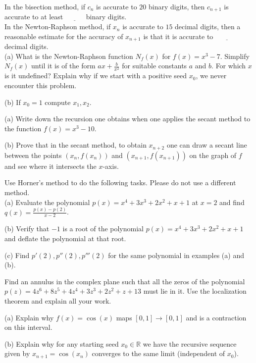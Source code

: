 \documentclass[12pt]{article}
\begin{document}
\newpage
{}
In the bisection method, if $c_n$ is accurate to $20$ binary digits, then $c_{n+1}$ is accurate to at least $\underline{~~~~~~~~~~~~}$ binary digits. \\
In the Newton-Raphson method, if $x_n$ is accurate to $15$ decimal digits, then a reasonable estimate for the accuracy of $x_{n+1}$ is that it is 
accurate to $\underline{~~~~~~~~~~~~~~~}$ decimal digits. \\ 

(a) What is the Newton-Raphson function $N_f(x)$ for $f(x)=x^3-7$. Simplify $N_f(x)$ until it is of the form 
$ax+\frac{b}{x^2}$ for suitable constants $a$ and $b$. For which $x$ is it undefined? Explain why if we start with a positive seed $x_0$, we never 
encounter this problem.

\vspace{2 in}

\noindent
(b) If $x_0=1$ compute $x_1, x_2$.

\newpage
{}
(a) Write down the recursion one obtains when one applies the secant method to the function $f(x)=x^3-10$. 

\vspace{2 in}

\noindent
(b) Prove that in the secant method, to obtain $x_{n+2}$ one can draw a secant line between the points $(x_n,f(x_n))$ and $(x_{n+1},f(x_{n+1}))$ on the 
graph of $f$ and see where it intersects the $x$-axis.

\newpage
{}
Use Horner's method to do the following tasks. Please do not use a different method. \\
(a) Evaluate the polynomial $p(x)=x^4+3x^3+2x^2+x+1$ at $x=2$ and find $q(x)=\frac{p(x)-p(2)}{x-2}$. 

\vspace{ 2 in}

\noindent
(b) Verify that $-1$ is a root of the polynomial $p(x)=x^4+3x^3+2x^2+x+1$ and deflate the polynomial at that root. \\

\vspace{2 in}

\noindent
(c) Find $p'(2),p''(2), p'''(2)$ for the same polynomial in examples (a) and (b).

\newpage
{} Find an annulus in the complex plane such that all the zeros of the polynomial 
$p(z)=4z^6 + 8z^5 + 4z^4 + 3z^3+2z^2+z+13$ must lie in it. Use the localization theorem and explain all your work.


\newpage
{} 
(a) Explain why $f(x)=\cos(x)$ maps $[0,1] \to [0,1]$ and is a contraction on this interval. 

\vspace{3 in}

\noindent
(b) Explain why for any starting seed $x_0 \in \mathbb{R}$ we have the recursive sequence given by $x_{n+1}=\cos(x_n)$ converges to the 
same limit (independent of $x_0$).




\problemsdone
\end{document}
